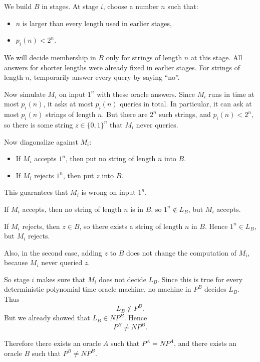 \documentclass[11pt]{article}
\begin{document}
We build $B$ in stages. At stage $i$, choose a number $n$ such that:
\begin{itemize}
    \item $n$ is larger than every length used in earlier stages,
    \item $p_i(n) < 2^n$.
\end{itemize}

We will decide membership in $B$ only for strings of length $n$ at this stage. All answers for shorter lengths were already fixed in earlier stages. For strings of length $n$, temporarily answer every query by saying ``no''.

Now simulate $M_i$ on input $1^n$ with these oracle answers. Since $M_i$ runs in time at most $p_i(n)$, it asks at most $p_i(n)$ queries in total. In particular, it can ask at most $p_i(n)$ strings of length $n$. But there are $2^n$ such strings, and $p_i(n) < 2^n$, so there is some string $z \in \{0,1\}^n$ that $M_i$ never queries.

Now diagonalize against $M_i$:
\begin{itemize}
    \item If $M_i$ accepts $1^n$, then put no string of length $n$ into $B$.
    \item If $M_i$ rejects $1^n$, then put $z$ into $B$.
\end{itemize}

This guarantees that $M_i$ is wrong on input $1^n$.

If $M_i$ accepts, then no string of length $n$ is in $B$, so $1^n \notin L_B$, but $M_i$ accepts.

If $M_i$ rejects, then $z \in B$, so there exists a string of length $n$ in $B$. Hence $1^n \in L_B$, but $M_i$ rejects.

Also, in the second case, adding $z$ to $B$ does not change the computation of $M_i$, because $M_i$ never queried $z$.

So stage $i$ makes sure that $M_i$ does not decide $L_B$. Since this is true for every deterministic polynomial time oracle machine, no machine in $P^B$ decides $L_B$. Thus
\[
L_B \notin P^B.
\]
But we already showed that $L_B \in NP^B$. Hence
\[
P^B \neq NP^B.
\]

Therefore there exists an oracle $A$ such that $P^A = NP^A$, and there exists an oracle $B$ such that $P^B \neq NP^B$.
\end{document}
